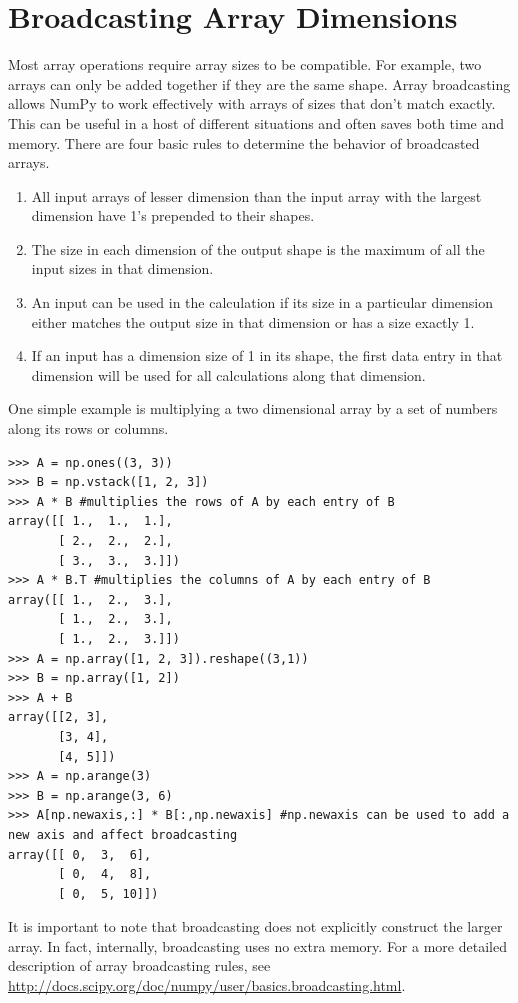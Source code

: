 \section*{Broadcasting Array Dimensions}
Most array operations require array sizes to be compatible.
For example, two arrays can only be added together if they are the same shape.
Array broadcasting allows NumPy to work effectively with arrays of sizes 
that don't match exactly. This can be useful in a host of different 
situations and often saves both time and memory. There are four basic rules 
to determine the behavior of broadcasted arrays.
\begin{enumerate}
\item All input arrays of lesser dimension than the input array with the
largest dimension have 1's prepended to their shapes.
\item The size in each dimension of the output shape is the maximum of all 
the input sizes in that dimension.
\item An input can be used in the calculation if its size in a particular 
dimension either matches the output size in that dimension or has a size 
exactly 1.
\item If an input has a dimension size of 1 in its shape, the first data 
entry in that dimension will be used for all calculations along that 
dimension.
\end{enumerate}

One simple example is multiplying a two dimensional array by a set of numbers 
along its rows or columns. 

\begin{lstlisting}
>>> A = np.ones((3, 3))
>>> B = np.vstack([1, 2, 3])
>>> A * B #multiplies the rows of A by each entry of B
array([[ 1.,  1.,  1.],
       [ 2.,  2.,  2.],
       [ 3.,  3.,  3.]])
>>> A * B.T #multiplies the columns of A by each entry of B
array([[ 1.,  2.,  3.],
       [ 1.,  2.,  3.],
       [ 1.,  2.,  3.]])
>>> A = np.array([1, 2, 3]).reshape((3,1))
>>> B = np.array([1, 2])
>>> A + B
array([[2, 3],
       [3, 4],
       [4, 5]])
>>> A = np.arange(3)
>>> B = np.arange(3, 6)
>>> A[np.newaxis,:] * B[:,np.newaxis] #np.newaxis can be used to add a new axis and affect broadcasting
array([[ 0,  3,  6],
       [ 0,  4,  8],
       [ 0,  5, 10]])
\end{lstlisting}

It is important to note that broadcasting does not explicitly construct the 
larger array. In fact, internally, broadcasting uses no extra memory.
For a more detailed description of array broadcasting rules, see 
\url{http://docs.scipy.org/doc/numpy/user/basics.broadcasting.html}.

